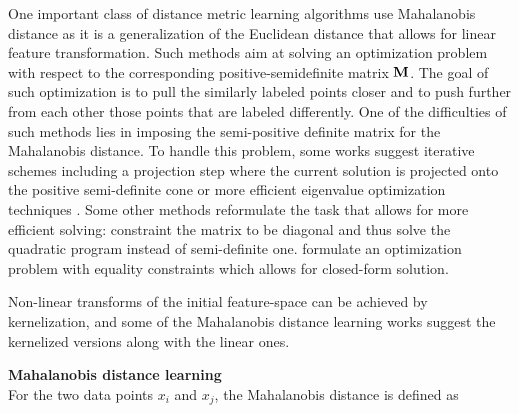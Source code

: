 One important class of distance metric learning algorithms use Mahalanobis distance as it is a generalization of the Euclidean distance that allows for linear feature transformation. Such methods aim at solving an optimization problem with respect to the corresponding positive-semidefinite matrix $\bold{M}$. The goal of such optimization is to pull the similarly labeled points closer and to push further from each other those points that are labeled differently. One of the difficulties of such methods lies in imposing the semi-positive definite matrix for the Mahalanobis distance. To handle this problem, some works suggest iterative schemes including a projection step where the current solution is projected onto the positive semi-definite cone \citep{globerson2006metric,xing2003distance, NIPS2005_2795} or more efficient eigenvalue optimization techniques \citep{ying2012distance}. Some other methods reformulate the task that allows for more efficient solving:  \citep{schultz2004learning} constraint the matrix to be diagonal and thus solve the quadratic program instead of semi-definite one. \citep{hirzer2012person} formulate an optimization problem with equality constraints which allows for closed-form solution.%

Non-linear transforms of the initial feature-space can be achieved by kernelization, and some of the Mahalanobis distance learning works \citep{davis2007information,globerson2006metric,NIPS2005_2795,schultz2004learning} suggest the kernelized versions along with the linear ones. 



\bigskip\ident\textbf{Mahalanobis distance learning}\\
\label{sec:mahalanobis}
For the two data points $x_i$ and $x_j$, the Mahalanobis distance is defined as 

